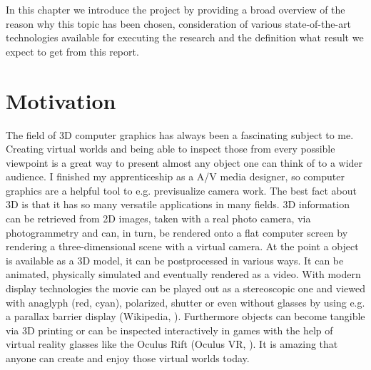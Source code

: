 In this chapter we introduce the project by providing a broad overview of the reason why this topic has been chosen, consideration of various state-of-the-art technologies available for executing the research and the definition what result we expect to get from this report.

\section{Motivation}

The field of 3D computer graphics has always been a fascinating subject to me. Creating virtual worlds and being able to inspect those from every possible viewpoint is a great way to present almost any object one can think of to a wider audience. I finished my apprenticeship as a A/V media designer, so computer graphics are a helpful tool to e.g. previsualize camera work. The best fact about 3D is that it has so many versatile applications in many fields. 3D information can be retrieved from 2D images, taken with a real photo camera, via photogrammetry and can, in turn, be rendered onto a flat computer screen by rendering a three-dimensional scene with a virtual camera. At the point a object is available as a 3D model, it can be postprocessed in various ways. It can be animated, physically simulated and eventually rendered as a video. With modern display technologies the movie can be played out as a stereoscopic one and viewed with anaglyph (red, cyan), polarized, shutter or even without glasses by using e.g. a parallax barrier display (Wikipedia, \parencite{wiki:ParallaxBarrier}). Furthermore objects can become tangible via 3D printing or can be inspected interactively in games with the help of virtual reality glasses like the Oculus Rift (Oculus VR, \parencite{OculusVR}). It is amazing that anyone can create and enjoy those virtual worlds today.

